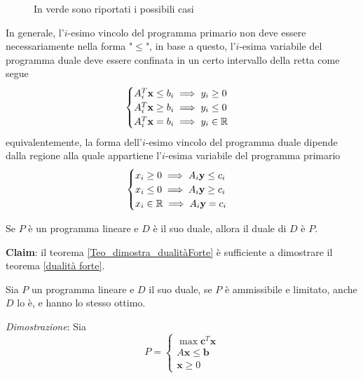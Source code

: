 \documentclass[10pt, letterpaper]{report}
\begin{document}
\begin{figure}[h]
    \caption{In verde sono riportati i possibili casi}
\end{figure}

In generale, l'$i$-esimo vincolo del programma primario non deve essere necessariamente nella forma "$\le$", in base a questo, l'$i$-esima variabile del programma duale deve essere confinata in un certo intervallo della retta come segue$$
\begin{cases}
    A_i^T\mathbf x\le b_i \implies y_i \ge 0\\
    A_i^T\mathbf x\ge b_i \implies y_i \le 0\\
    A_i^T\mathbf x= b_i \implies y_i \in {\mathbb R}
\end{cases}$$
equivalentemente, la forma dell'$i$-esimo vincolo del programma duale dipende dalla regione alla quale appartiene l'$i$-esima variabile del programma primario 
$$\begin{cases}
    x_i \ge 0 \implies A_i\mathbf y \le c_i\\ 
    x_i \le 0 \implies A_i\mathbf y \ge c_i\\ 
    x_i \in {\mathbb R}\implies A_i\mathbf y = c_i
\end{cases}$$
\begin{proposizione}
    Se $P$ è un programma lineare e $D$ è il suo duale, allora il duale di $D$ è $P$.
\end{proposizione}
\textbf{Claim}: il teorema \ref{Teo_dimostra_dualitàForte} è sufficiente a dimostrare il teorema \ref{dualità forte}.  
\begin{teorema}\label{Teo_dimostra_dualitàForte}
    Sia $P$ un programma lineare e $D$ il suo duale, se $P$ è ammissibile e limitato, anche $D$ lo è, e hanno lo stesso ottimo.
\end{teorema}
\textit{Dimostrazione}: Sia 
$$ P=\begin{cases}
    \max \mathbf c^T\mathbf x\\ 
        A\mathbf x \le \mathbf b \\ 
        \mathbf x \ge 0 
\end{cases}$$
\end{document}
